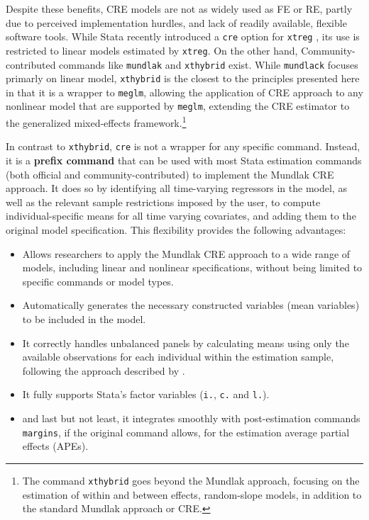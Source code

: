 \documentclass[bib]{statapress}
\providecommand{\tightlist}{%
  \setlength{\itemsep}{0pt}\setlength{\parskip}{0pt}}\usepackage{longtable,booktabs,array}
\begin{document}
Despite these benefits, CRE models are not as widely used as FE or RE,
partly due to perceived implementation hurdles, and lack of readily
available, flexible software tools. While Stata recently introduced a
\texttt{cre} option for \texttt{xtreg}
\citep[\texttt{xtreg,\ cre}]{stata19}, its use is restricted to linear
models estimated by \texttt{xtreg}. On the other hand,
Community-contributed commands like \texttt{mundlak} \citep{perales2013}
and \texttt{xthybrid} \citep{schunck2017} exist. While \texttt{mundlack}
focuses primarly on linear model, \texttt{xthybrid} is the closest to
the principles presented here in that it is a wrapper to \texttt{meglm},
allowing the application of CRE approach to any nonlinear model that are
supported by \texttt{meglm}, extending the CRE estimator to the
generalized mixed-effects framework.\footnote{The command
  \texttt{xthybrid} goes beyond the Mundlak approach, focusing on the
  estimation of within and between effects, random-slope models, in
  addition to the standard Mundlak approach or CRE.}

In contrast to \texttt{xthybrid}, \texttt{cre} is not a wrapper for any
specific command. Instead, it is a \textbf{prefix command} that can be
used with most Stata estimation commands (both official and
community-contributed) to implement the Mundlak CRE approach. It does so
by identifying all time-varying regressors in the model, as well as the
relevant sample restrictions imposed by the user, to compute
individual-specific means for all time varying covariates, and adding
them to the original model specification. This flexibility provides the
following advantages:

\begin{itemize}
\tightlist
\item
  Allows researchers to apply the Mundlak CRE approach to a wide range
  of models, including linear and nonlinear specifications, without
  being limited to specific commands or model types.
\item
  Automatically generates the necessary constructed variables (mean
  variables) to be included in the model.
\item
  It correctly handles unbalanced panels by calculating means using only
  the available observations for each individual within the estimation
  sample, following the approach described by \citet{wooldridge2019}.
\item
  It fully supports Stata's factor variables (\texttt{i.}, \texttt{c.}
  and \texttt{l.}).
\item
  and last but not least, it integrates smoothly with post-estimation
  commands \texttt{margins}, if the original command allows, for the
  estimation average partial effects (APEs).
\end{itemize}
\end{document}
